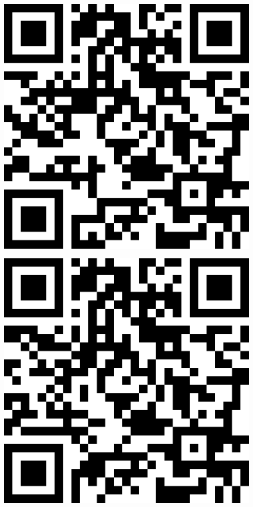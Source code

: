 \documentclass[letterpaper]{article}
\begin{document}
 \endgroup 
 \vspace*{\fill} 
 \pagebreak 
{} 
 \vspace*{\fill} 
 \begingroup 
 \centerline{\includegraphics[scale=1,width=5in,height=5in]{Office3625.png}} 
 \endgroup 
 \vspace*{\fill} 
 \pagebreak 
{} 
 \vspace*{\fill} 
 \begingroup 
 \centerline{\includegraphics[scale=1,width=5in,height=5in]{Office3627.png}} 
\end{document}
